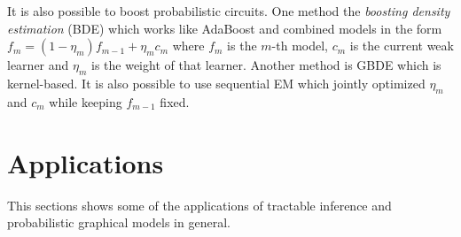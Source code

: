			It is also possible to boost probabilistic circuits. One method the \emph{boosting density estimation} (BDE) which works like AdaBoost and combined models in the form \( f_m = (1 - \eta_m) f_{m - 1} + \eta_m c_m \) where \(f_m\) is the \(m\)-th model, \(c_m\) is the current weak learner and \(\eta_m\) is the weight of that learner. Another method is GBDE which is kernel-based. It is also possible to use sequential EM which jointly optimized \(\eta_m\) and \(c_m\) while keeping \(f_{m - 1}\) fixed.


	\section{Applications}
		This sections shows some of the applications of tractable inference and probabilistic graphical models in general.


